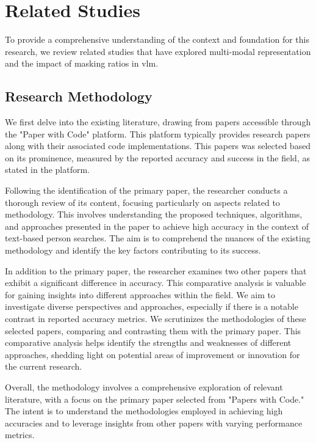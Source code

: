 \chapter{Related Studies }
To provide a comprehensive understanding of the context and foundation for this research, we review related studies that have explored multi-modal representation and the impact of masking ratios in \acrfull{vlm}.


\section{Research Methodology}
We first delve into the existing literature, drawing from papers accessible through the "Paper with Code" platform. This platform typically provides research papers along with their associated code implementations. This papers was selected based on its prominence, measured by the reported accuracy and success in the field, as stated in the platform.

Following the identification of the primary paper, the researcher conducts a thorough review of its content, focusing particularly on aspects related to methodology. This involves understanding the proposed techniques, algorithms, and approaches presented in the paper to achieve high accuracy in the context of text-based person searches. The aim is to comprehend the nuances of the existing methodology and identify the key factors contributing to its success.

In addition to the primary paper, the researcher examines two other papers that exhibit a significant difference in accuracy. This comparative analysis is valuable for gaining insights into different approaches within the field. We aim to investigate diverse perspectives and approaches, especially if there is a notable contrast in reported accuracy metrics.
We scrutinizes the methodologies of these selected papers, comparing and contrasting them with the primary paper. This comparative analysis helps identify the strengths and weaknesses of different approaches, shedding light on potential areas of improvement or innovation for the current research.

Overall, the methodology involves a comprehensive exploration of relevant literature, with a focus on the primary paper selected from "Papers with Code." The intent is to understand the methodologies employed in achieving high accuracies and to leverage insights from other papers with varying performance metrics. 

